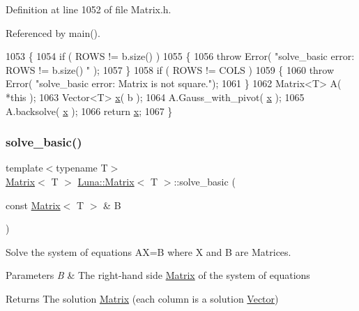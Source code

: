 Definition at line 1052 of file Matrix.\+h.



Referenced by main().


\begin{DoxyCode}
1053   \{
1054     \textcolor{keywordflow}{if} ( ROWS != b.size() )
1055     \{
1056       \textcolor{keywordflow}{throw} Error( \textcolor{stringliteral}{"solve\_basic error: ROWS != b.size() "} );
1057     \}
1058     \textcolor{keywordflow}{if} ( ROWS != COLS )
1059     \{
1060       \textcolor{keywordflow}{throw} Error( \textcolor{stringliteral}{"solve\_basic error: Matrix is not square."});
1061     \}
1062     Matrix<T> A( *\textcolor{keyword}{this} );
1063     Vector<T> \hyperlink{namespaceHeat__plot_aa88370c16b85b784ccbde3ed88bc1991}{x}( b );
1064     A.Gauss\_with\_pivot( \hyperlink{namespaceHeat__plot_aa88370c16b85b784ccbde3ed88bc1991}{x} );
1065     A.backsolve( \hyperlink{namespaceHeat__plot_aa88370c16b85b784ccbde3ed88bc1991}{x} );
1066     \textcolor{keywordflow}{return} \hyperlink{namespaceHeat__plot_aa88370c16b85b784ccbde3ed88bc1991}{x};
1067   \}
\end{DoxyCode}
\mbox{\label{classLuna_1_1Matrix_a986975f00bf3ebbf0b298887e2f1d7f6}} 
\subsubsection{\texorpdfstring{solve\+\_\+basic()}{solve\_basic()}\hspace{0.1cm}{\footnotesize\ttfamily [2/2]}}
{\footnotesize\ttfamily template$<$typename T$>$ \\
\hyperlink{classLuna_1_1Matrix}{Matrix}$<$ T $>$ \hyperlink{classLuna_1_1Matrix}{Luna\+::\+Matrix}$<$ T $>$\+::solve\+\_\+basic (\begin{DoxyParamCaption}\item[{const \hyperlink{classLuna_1_1Matrix}{Matrix}$<$ T $>$ \&}]{B }\end{DoxyParamCaption})\hspace{0.3cm}{\ttfamily [inline]}}



Solve the system of equations AX=B where X and B are Matrices. 


\begin{DoxyParams}{Parameters}
{\em B} & The right-\/hand side \hyperlink{classLuna_1_1Matrix}{Matrix} of the system of equations \\
\hline
\end{DoxyParams}
\begin{DoxyReturn}{Returns}
The solution \hyperlink{classLuna_1_1Matrix}{Matrix} (each column is a solution \hyperlink{classLuna_1_1Vector}{Vector}) 
\end{DoxyReturn}



